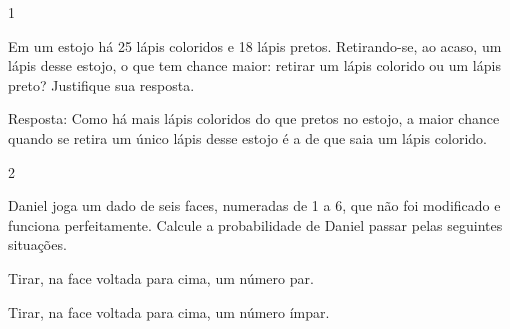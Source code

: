 \begin{escolha}
{\begin{escolha}



\num{1}

Em um estojo há 25 lápis coloridos e 18 lápis pretos. Retirando-se, ao
acaso, um lápis desse estojo, o que tem chance maior: retirar um lápis
colorido ou um lápis preto? Justifique sua resposta.


Resposta:
Como há mais lápis coloridos do que pretos no estojo, a maior chance
quando se retira um único lápis desse estojo é a de que saia um lápis
colorido.


\num{2}

Daniel joga um dado de seis faces, numeradas de 1 a 6, que não foi modificado e funciona perfeitamente. Calcule a probabilidade de Daniel passar pelas seguintes situações.

\begin{escolha}

\item
  Tirar, na face voltada para cima, um número par.
\end{escolha}


\begin{escolha}

\item
  Tirar, na face voltada para cima, um número ímpar.
\end{escolha}



\end{escolha}}
\end{escolha}
